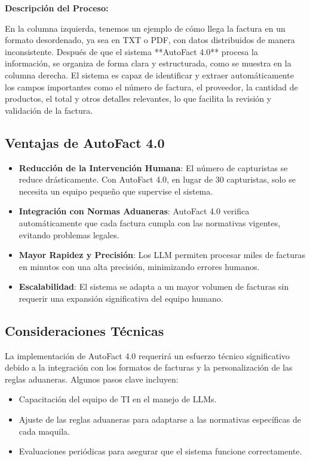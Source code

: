 \textbf{Descripción del Proceso:}

En la columna izquierda, tenemos un ejemplo de cómo llega la factura en un formato desordenado, ya sea en TXT o PDF, con datos distribuidos de manera inconsistente. Después de que el sistema **AutoFact 4.0** procesa la información, se organiza de forma clara y estructurada, como se muestra en la columna derecha. El sistema es capaz de identificar y extraer automáticamente los campos importantes como el número de factura, el proveedor, la cantidad de productos, el total y otros detalles relevantes, lo que facilita la revisión y validación de la factura.

\subsection{Ventajas de AutoFact 4.0}

\begin{itemize}
    \item \textbf{Reducción de la Intervención Humana}: El número de capturistas se reduce drásticamente. Con AutoFact 4.0, en lugar de 30 capturistas, solo se necesita un equipo pequeño que supervise el sistema.
    \item \textbf{Integración con Normas Aduaneras}: AutoFact 4.0 verifica automáticamente que cada factura cumpla con las normativas vigentes, evitando problemas legales.
    \item \textbf{Mayor Rapidez y Precisión}: Los LLM permiten procesar miles de facturas en minutos con una alta precisión, minimizando errores humanos.
    \item \textbf{Escalabilidad}: El sistema se adapta a un mayor volumen de facturas sin requerir una expansión significativa del equipo humano.
\end{itemize}

\subsection{Consideraciones Técnicas}

La implementación de AutoFact 4.0 requerirá un esfuerzo técnico significativo debido a la integración con los formatos de facturas y la personalización de las reglas aduaneras. Algunos pasos clave incluyen:

\begin{itemize}
    \item Capacitación del equipo de TI en el manejo de LLMs.
    \item Ajuste de las reglas aduaneras para adaptarse a las normativas específicas de cada maquila.
    \item Evaluaciones periódicas para asegurar que el sistema funcione correctamente.
\end{itemize}

